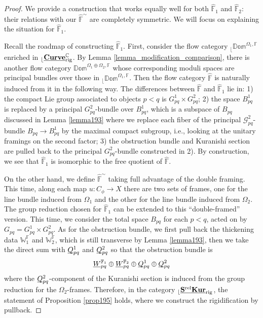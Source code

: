 \documentclass[reqno, 10pt]{amsart}
\numberwithin{equation}{section}
\numberwithin{equation}{section}
\theoremstyle{definition}
\theoremstyle{remark}
\newcommand{\beqn}{\begin{equation*}}
\newcommand{\eeqn}{\end{equation*}}
\newcommand{\mb}{\mathbb}
\newcommand{\mc}{\mathcal}
\renewcommand{\outer}{{}_{\lfloor}}
\newcommand{\uds}[1]{\underline{\smash{#1}}}
\begin{document}
\begin{proof}
We provide a construction that works equally well for both $\hat{\mb F}_1$ and $\hat{\mb F}_2$: their relations with our $\hat{\mb F}^\sim$ are completely symmetric. We will focus on explaining the situation for $\hat{\mb F}_1$.

Recall the roadmap of constructing $\hat {\mb F}_1$. First, consider the flow category $\outer \mb{Dom}^{\Omega_1, {\mb F}}$ enriched in $\outer \uds{\bf Curve}_{\rm rig}^{\mb C}$. By Lemma \ref{lemma_modification_comparison}, there is another flow category $\mb{Dom}^{\Omega_1 \oplus \Omega_2, {\mb F}}$ whose corresponding moduli spaces are principal bundles over those in $\outer \mb{Dom}^{\Omega_1, {\mb F}}$. Then the flow category $\hat{\mb F}$ is naturally induced from it in the following way. The differences between $\hat{\mb F}$ and $\hat{\mb F}_1$ lie in: 1) the compact Lie group associated to objects $p < q$ is $G^1_{pq} \times G^2_{pq}$; 2) the space $B^1_{pq}$ is replaced by a principal $G^2_{pq}$-bundle over $B^1_{pq}$, which is a subspace of $B_{pq}$ discussed in Lemma \ref{lemma193} where we replace each fiber of the principal ${\mc G}^2_{pq}$-bundle $B_{pq} \to B^1_{pq}$ by the maximal compact subgroup, i.e., looking at the unitary framings on the second factor; 3) the obstruction bundle and Kuranishi section are pulled back to the principal $G^2_{pq}$-bundle constructed in 2). By construction, we see that $\hat{\mb F}_1$ is isomorphic to the free quotient of $\hat{\mb F}$.

On the other hand, we define $\hat {\mb F}^\sim$ taking full advantage of the double framing. This time, along each map $u: C_\phi \to X$ there are two sets of frames, one for the line bundle induced from $\Omega_1$ and the other for the line bundle induced from $\Omega_2$. The group reduction chosen for $\hat {\mb F}_1$ can be extended to this ``double-framed'' version. This time, we consider the total space $B_{pq}$ for each $p < q$, acted on by $G_{pq} = G^1_{pq} \times G^2_{pq}$. As for the obstruction bundle, we first pull back the thickening data ${\mb W}^{\mb F}_1$ and ${\mb W}^{\mb F}_2$, which is still transverse by Lemma \ref{lemma193}, then we take the direct sum with $\uds Q_{pq}^1$ and $\uds Q_{pq}^2$ so that the obstruction bundle is 
\beqn
\uds W_{pq}^{{\mb F}_1} \oplus \uds W_{pq}^{{\mb F}_2} \oplus \uds Q_{pq}^1 \oplus \uds Q_{pq}^2
\eeqn
where the $\uds Q_{pq}^2$-component of the Kuranishi section is induced from the group reduction for the $\Omega_2$-frames. Therefore, in the category $\outer \uds{\bf S^{\rm rel} Kur}_{\rm rig}$, the statement of Proposition \ref{prop195} holds, where we construct the rigidification by pullback.


\end{proof}
\end{document}
